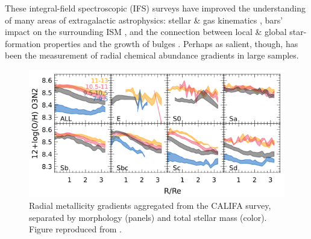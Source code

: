 These integral-field spectroscopic (IFS) surveys have improved the understanding of many areas of extragalactic astrophysics: stellar \& gas kinematics \citep{cortese_14_kinematics}, bars' impact on the surrounding ISM \citep{lin_17_bars, krishnarao_20_bars-mw-analogs}, and the connection between local \& global star-formation properties and the growth of bulges \citep{ellison_18_inside-out}. Perhaps as salient, though, has been the measurement of radial chemical abundance gradients in large samples.  


\begin{figure}
    \centering
    \includegraphics[width=\textwidth]{logoh12_sanchez}
    \caption[Average radial metallicity gradients separated by total stellar mass and morphology (CALIFA)]{\fixspacing Radial metallicity gradients aggregated from the CALIFA survey, separated by morphology (panels) and total stellar mass (color). Figure reproduced from \citet{sanchez_19_review}.}
    \label{fig:logoh12_sanchez}
\end{figure}

